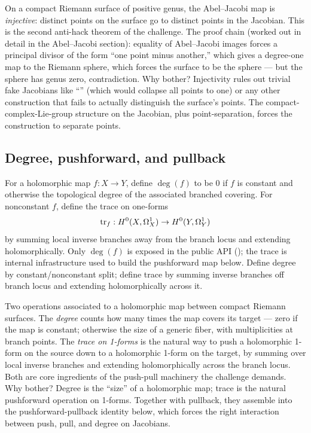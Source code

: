 \begin{layman}
On a compact Riemann surface of positive genus, the Abel--Jacobi map is
\emph{injective}: distinct points on the surface go to distinct points
in the Jacobian. This is the second anti-hack theorem of the
challenge. The proof chain (worked out in detail in the Abel--Jacobi
section):
equality of Abel--Jacobi images forces a principal divisor of the form
``one point minus another,'' which gives a degree-one map to the
Riemann sphere, which forces the surface to be the sphere --- but the
sphere has genus zero, contradiction. Why bother? Injectivity rules
out trivial fake Jacobians like ``''
(which would collapse all points to one) or any other construction
that fails to actually distinguish the surface's points. The compact-complex-Lie-group structure on the Jacobian, plus
point-separation, forces the construction to separate points.
\end{layman}

\subsection{Degree, pushforward, and pullback}

\begin{definition}
\label{def:degree-trace}
For a holomorphic map \(f:X\to Y\), define \(\deg(f)\) to be \(0\) if
\(f\) is constant and otherwise the topological degree of the associated
branched covering. For nonconstant \(f\), define the trace on one-forms
\[
  \operatorname{tr}_f : H^{0}(X,\Omega^{1}_{X}) \to H^{0}(Y,\Omega^{1}_{Y})
\]
by summing local inverse branches away from the branch locus and extending
holomorphically. Only \(\deg(f)\) is exposed in the public API
(); the trace is internal infrastructure used to
build the pushforward map below.
\leanok
\proofplan
Define degree by constant/nonconstant split; define trace by summing inverse
branches off branch locus and extending holomorphically across it.
\end{definition}

\begin{layman}
Two operations associated to a holomorphic map between compact Riemann
surfaces. The \emph{degree} counts how many times the map covers its
target --- zero if the map is constant; otherwise the size of a generic
fiber, with multiplicities at branch points. The \emph{trace on
1-forms} is the natural way to push a holomorphic 1-form on the source
down to a holomorphic 1-form on the target, by summing over local
inverse branches and extending holomorphically across the branch
locus. Both are core ingredients of the push-pull machinery the
challenge demands. Why bother? Degree is the ``size'' of a
holomorphic map; trace is the natural pushforward operation on
1-forms. Together with pullback, they assemble into the
pushforward-pullback identity below, which forces the right
interaction between push, pull, and degree on Jacobians.
\end{layman}

